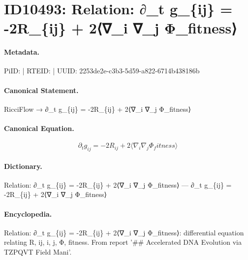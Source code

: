 \section*{ID10493: Relation: ∂\_t g\_\{ij\} = -2R\_\{ij\} + 2⟨∇\_i ∇\_j Φ\_fitness⟩}
\paragraph{Metadata.}
PiID:  | RTEID:  | UUID: 2253de2e-c3b3-5d59-a822-6714b438186b

\paragraph{Canonical Statement.}
RicciFlow → ∂\_t g\_\{ij\} = -2R\_\{ij\} + 2⟨∇\_i ∇\_j Φ\_fitness⟩

\paragraph{Canonical Equation.}
\[
∂_t g_{ij} = -2R_{ij} + 2⟨∇_i ∇_j Φ_fitness⟩
\]

\paragraph{Dictionary.}
Relation: ∂\_t g\_\{ij\} = -2R\_\{ij\} + 2⟨∇\_i ∇\_j Φ\_fitness⟩ — ∂\_t g\_\{ij\} = -2R\_\{ij\} + 2⟨∇\_i ∇\_j Φ\_fitness⟩

\paragraph{Encyclopedia.}
Relation: ∂\_t g\_\{ij\} = -2R\_\{ij\} + 2⟨∇\_i ∇\_j Φ\_fitness⟩: differential equation relating R, ij, i, j, Φ, fitness. From report '\#\# Accelerated DNA Evolution via TZPQVT Field Mani'.

